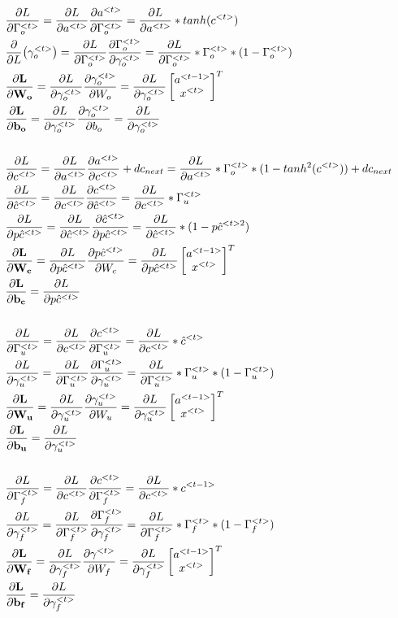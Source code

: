 \documentclass{article}
\newcommand*{\cat}[2]{
    \begin{bmatrix}
        #1 \\
        #2
        \end{bmatrix}
}
\begin{document}
\begin{align*}    
    &\pdv{L}{\Gamma_o^{<t>}} = \pdv{L}{a^{<t>}}\pdv{a^{<t>}}{\Gamma_o^{<t>}} = \pdv{L}{a^{<t>}} * tanh(c^{<t>}) \\
    &\pdv{L}(\gamma_o^{<t>}) = \pdv{L}{\Gamma_o^{<t>}} \pdv{\Gamma_o^{<t>}}{\gamma_o^{<t>}} = \pdv{L}{\Gamma_o^{<t>}} * \Gamma_o^{<t>} * (1 - \Gamma_o^{<t>}) \\
    &\mathbf{\pdv{L}{W_o}} = \pdv{L}{\gamma_o^{<t>}}\pdv{\gamma_o^{<t>}}{W_o} = \pdv{L}{\gamma_o^{<t>}} \cat{a^{<t-1>}}{x^{<t>}}^T \\
    &\mathbf{\pdv{L}{b_o}} = \pdv{L}{\gamma_o^{<t>}}\pdv{\gamma_o^{<t>}}{b_o} = \pdv{L}{\gamma_o^{<t>}} \\
    \\
    &\pdv{L}{c^{<t>}} = \pdv{L}{a^{<t>}}\pdv{a^{<t>}}{c^{<t>}} + dc_{next} = \pdv{L}{a^{<t>}} * \Gamma_o^{<t>} * (1 - tanh^2(c^{<t>})) + dc_{next} \\
    &\pdv{L}{\hat{c}^{<t>}} = \pdv{L}{c^{<t>}}\pdv{c^{<t>}}{\hat{c}^{<t>}} = \pdv{L}{c^{<t>}} * \Gamma_u^{<t>} \\
    &\pdv{L}{p\hat{c}^{<t>}} = \pdv{L}{\hat{c}^{<t>}} \pdv{\hat{c}^{<t>}}{p\hat{c}^{<t>}} = \pdv{L}{\hat{c}^{<t>}} * (1 - p\hat{c}^{<t>2}) \\
    &\mathbf{\pdv{L}{W_c}} = \pdv{L}{p\hat{c}^{<t>}}\pdv{p\hat{c}^{<t>}}{W_c} = \pdv{L}{p\hat{c}^{<t>}} \cat{a^{<t-1>}}{x^{<t>}}^T \\
    &\mathbf{\pdv{L}{b_c}} = \pdv{L}{p\hat{c}^{<t>}} \\
    \\
    &\pdv{L}{\Gamma_u^{<t>}} = \pdv{L}{c^{<t>}}\pdv{c^{<t>}}{\Gamma_u^{<t>}} = \pdv{L}{c^{<t>}} * \hat{c}^{<t>} \\
    &\pdv{L}{\gamma_u^{<t>}} = \pdv{L}{\Gamma_u^{<t>}}\pdv{\Gamma_u^{<t>}}{\gamma_u^{<t>}} = \pdv{L}{\Gamma_u^{<t>}} * \Gamma_u^{<t>} * (1 - \Gamma_u^{<t>}) \\
    &\mathbf{\pdv{L}{W_u}} = \pdv{L}{\gamma_u^{<t>}}\pdv{\gamma_u^{<t>}}{W_u} = \pdv{L}{\gamma_u^{<t>}}\cat{a^{<t-1>}}{x^{<t>}}^T \\
    &\mathbf{\pdv{L}{b_u}} = \pdv{L}{\gamma_u^{<t>}} \\
    \\
    &\pdv{L}{\Gamma_f^{<t>}} = \pdv{L}{c^{<t>}}\pdv{c^{<t>}}{\Gamma_f^{<t>}} = \pdv{L}{c^{<t>}} * c^{<t-1>} \\
    &\pdv{L}{\gamma_f^{<t>}} = \pdv{L}{\Gamma_f^{<t>}}\pdv{\Gamma_f^{<t>}}{\gamma_f^{<t>}} = \pdv{L}{\Gamma_f^{<t>}} * \Gamma_f^{<t>} * (1 - \Gamma_f^{<t>}) \\
    &\mathbf{\pdv{L}{W_f}} = \pdv{L}{\gamma_f^{<t>}}\pdv{\gamma^{<t>}}{W_f} = \pdv{L}{\gamma_f^{<t>}}\cat{a^{<t-1>}}{x^{<t>}}^T \\
    &\mathbf{\pdv{L}{b_f}} = \pdv{L}{\gamma_f^{<t>}} 
\end{align*}
\newpage
\end{document}
